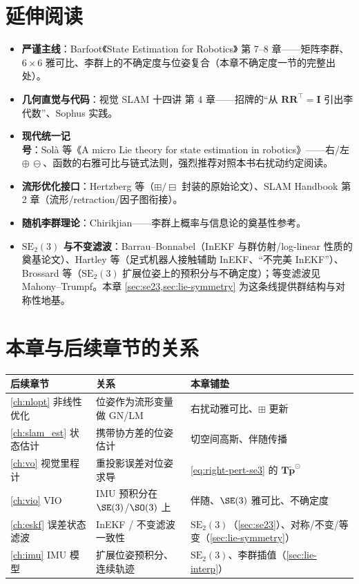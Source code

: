 \section*{延伸阅读}
\begin{itemize}
  \item \textbf{严谨主线}：Barfoot《State Estimation for Robotics》\cite{barfoot2024state} 第 7--8 章——矩阵李群、$6\times6$ 雅可比、李群上的不确定度与位姿复合（本章不确定度一节的完整出处）。
  \item \textbf{几何直觉与代码}：视觉 SLAM 十四讲\cite{gaoxiang2019slam14} 第 4 章——招牌的“从 $\mathbf{R}\mathbf{R}^\top=\mathbf{I}$ 引出李代数”、Sophus 实践。
  \item \textbf{现代统一记号}：Solà 等《A micro Lie theory for state estimation in robotics》\cite{sola2018micro}——右/左 $\oplus\,\ominus$、函数的右雅可比与链式法则，强烈推荐对照本书右扰动约定阅读。
  \item \textbf{流形优化接口}：Hertzberg 等\cite{hertzberg2013integrating}（$\boxplus/\boxminus$ 封装的原始论文）、SLAM Handbook\cite{carlone2026handbook} 第 2 章（流形/retraction/因子图衔接）。
  \item \textbf{随机李群理论}：Chirikjian\cite{chirikjian2011stochastic}——李群上概率与信息论的奠基性参考。
  \item \textbf{$\mathrm{SE}_2(3)$ 与不变滤波}：Barrau--Bonnabel\cite{barrau2017invariant}（InEKF 与群仿射/log-linear 性质的奠基论文）、Hartley 等\cite{hartley2020contact}（足式机器人接触辅助 InEKF、“不完美 InEKF”）、Brossard 等\cite{brossard2021associating}（$\mathrm{SE}_2(3)$ 扩展位姿上的预积分与不确定度）；等变滤波见 Mahony--Trumpf\cite{mahony2021equivariant}。本章 \cref{sec:se23,sec:lie-symmetry} 为这条线提供群结构与对称性地基。
\end{itemize}

\section*{本章与后续章节的关系}
\begin{table}[H]\centering\small
\begin{tabular}{lll}
\toprule
后续章节 & 关系 & 本章铺垫 \\
\midrule
\cref{ch:nlopt} 非线性优化 & 位姿作为流形变量做 GN/LM & 右扰动雅可比、$\boxplus$ 更新 \\
\cref{ch:slam_est} 状态估计 & 携带协方差的位姿估计 & 切空间高斯、伴随传播 \\
\cref{ch:vo} 视觉里程计 & 重投影误差对位姿求导 & \cref{eq:right-pert-se3} 的 $\mathbf{T}\tilde{\mathbf{p}}^\odot$ \\
\cref{ch:vio} VIO & IMU 预积分在 $\SE(3)$/$\SO(3)$ 上 & 伴随、$\SE(3)$ 雅可比、不确定度 \\
\cref{ch:eskf} 误差状态滤波 & InEKF / 不变滤波一致性 & $\mathrm{SE}_2(3)$（\cref{sec:se23}）、对称/不变/等变（\cref{sec:lie-symmetry}）\\
\cref{ch:imu} IMU 模型 & 扩展位姿预积分、连续轨迹 & $\mathrm{SE}_2(3)$、李群插值（\cref{sec:lie-interp}）\\
\bottomrule
\end{tabular}
\end{table}

